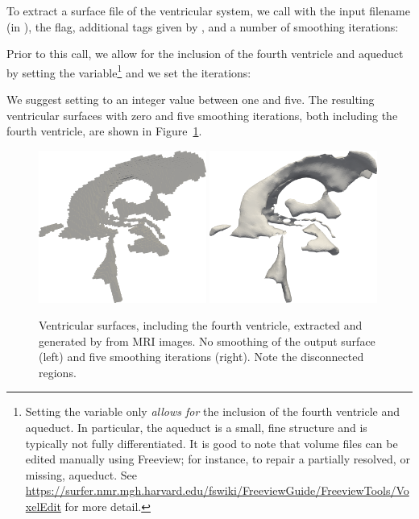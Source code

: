 \noindent To extract a surface file of the ventricular system, we call
 with the input filename (in ), the  flag, additional tags given by , and a number of smoothing iterations:


\noindent Prior to this call, we allow for the inclusion of the fourth
ventricle and aqueduct by setting the  variable\footnote{Setting 
the  variable only \textit{allows for} the inclusion of the fourth 
ventricle and aqueduct.  In particular, the aqueduct is a small, fine structure 
and is typically not fully differentiated.  It is good to note 
that volume files can be edited manually using Freeview; for instance, to 
repair a partially resolved, or missing, aqueduct. See 
\url{https://surfer.nmr.mgh.harvard.edu/fswiki/FreeviewGuide/FreeviewTools/VoxelEdit} 
for more detail.} and we set the  iterations:


\noindent We suggest setting  to an
integer value between one and five. The resulting ventricular surfaces
with zero and five smoothing iterations, both including the fourth
ventricle, are shown in
Figure~\ref{fig:chp4:ernie-ventricles-smoothing-example}.
\begin{figure}
  \includegraphics[width=0.49\textwidth]{./graphics/chp4/ernie-vent-0smooth-r.png}
  \includegraphics[width=0.49\textwidth]{./graphics/chp4/ernie-vent-5smooth-r.png}
  \caption{Ventricular surfaces, including the fourth ventricle,
    extracted and generated by \freesurfer{} from MRI images. No
    smoothing of the output surface (left) and five smoothing
    iterations (right). Note the disconnected regions.}
  \label{fig:chp4:ernie-ventricles-smoothing-example}
\end{figure}

